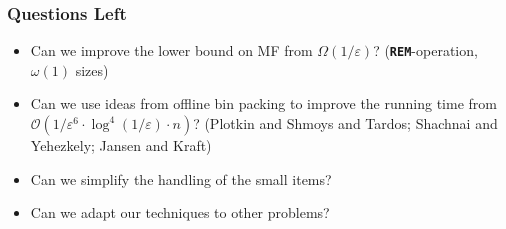 \documentclass[german,table]{beamer}
\newcommand{\myOperationName}[1]{\texttt{\textbf{#1}}}
\begin{document}
\begin{frame}
  \frametitle{Questions Left}
  \begin{itemize}[<+-|alert@+>]
  \item Can we improve the lower bound on MF from
    $\Omega(1/\varepsilon)$? (\myOperationName{REM}-operation, $\omega(1)$ sizes)

  \item Can we use ideas from offline bin packing to improve the running
    time from
    $\mathcal{O}(1/\varepsilon^{6}\cdot \log^{4}(1/\varepsilon)\cdot n)$?
    (Plotkin and Shmoys and Tardos; Shachnai and Yehezkely; Jansen and Kraft)
  \item Can we simplify the handling of the small items?
  \item Can we adapt our techniques to other problems?
  \end{itemize}
  
\end{frame}
\end{document}
